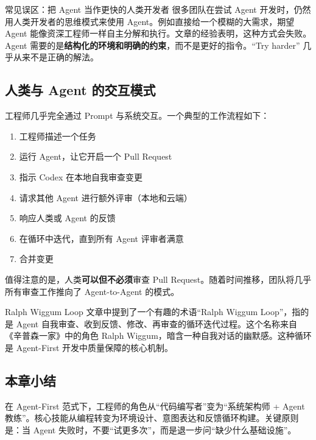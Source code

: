 \begin{warningbox}{常见误区：把 Agent 当作更快的人类开发者}
很多团队在尝试 Agent 开发时，仍然用人类开发者的思维模式来使用 Agent。例如直接给一个模糊的大需求，期望 Agent 能像资深工程师一样自主分解和执行。文章的经验表明，这种方式会失败。Agent 需要的是\textbf{结构化的环境和明确的约束}，而不是更好的指令。``Try harder'' 几乎从来不是正确的解法。
\end{warningbox}

\subsection{人类与 Agent 的交互模式}

工程师几乎完全通过 Prompt 与系统交互。一个典型的工作流程如下：

\begin{enumerate}[nosep]
  \item 工程师描述一个任务
  \item 运行 Agent，让它开启一个 Pull Request
  \item 指示 Codex 在本地自我审查变更
  \item 请求其他 Agent 进行额外评审（本地和云端）
  \item 响应人类或 Agent 的反馈
  \item 在循环中迭代，直到所有 Agent 评审者满意
  \item 合并变更
\end{enumerate}

值得注意的是，人类\textbf{可以但不必须}审查 Pull Request。随着时间推移，团队将几乎所有审查工作推向了 Agent-to-Agent 的模式。

\begin{knowledgebox}{Ralph Wiggum Loop}
文章中提到了一个有趣的术语``Ralph Wiggum Loop''，指的是 Agent 自我审查、收到反馈、修改、再审查的循环迭代过程。这个名称来自《辛普森一家》中的角色 Ralph Wiggum，暗含一种自我对话的幽默感。这种循环是 Agent-First 开发中质量保障的核心机制。
\end{knowledgebox}

\subsection{本章小结}

在 Agent-First 范式下，工程师的角色从``代码编写者''变为``系统架构师 + Agent 教练''。核心技能从编程转变为环境设计、意图表达和反馈循环构建。关键原则是：当 Agent 失败时，不要``试更多次''，而是退一步问``缺少什么基础设施''。

\newpage

